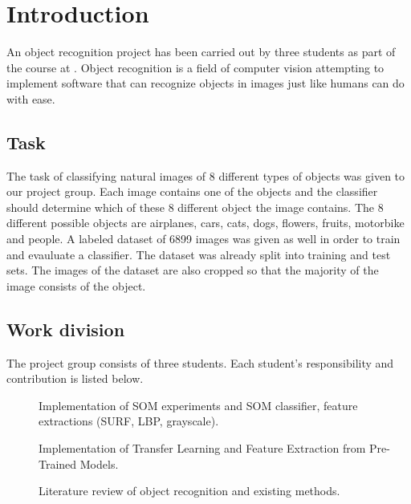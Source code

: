 \documentclass[doc/report.tex]{subfiles}
\begin{document}
\section{Introduction}
An object recognition project has been carried out by three students as part of
the course \courseName{} at \courseUniversity. Object recognition is a field of
computer vision attempting to implement software that can recognize objects in
images just like humans can do with ease.

\subsection{Task}
The task of classifying natural images of 8 different types of objects was
given to our project group. Each image contains one of the objects and the
classifier should determine which of these 8 different object the image
contains. The 8 different possible objects are airplanes, cars, cats, dogs,
flowers, fruits, motorbike and people. A labeled dataset of 6899 images was
given as well in order to train and evauluate a classifier. The dataset was
already split into training and test sets. The images of the dataset are also
cropped so that the majority of the image consists of the object.

\subsection{Work division}
The project group consists of three students. Each student's responsibility and
contribution is listed below.

\begin{description}
    \item[\authorA] Implementation of SOM experiments and SOM classifier,
        feature extractions (SURF, LBP, grayscale).
    \item[\authorB] Implementation of Transfer Learning and Feature Extraction
        from Pre-Trained Models.
    \item[\authorC] Literature review of object recognition and existing
        methods.
\end{description}
    
\end{document}
